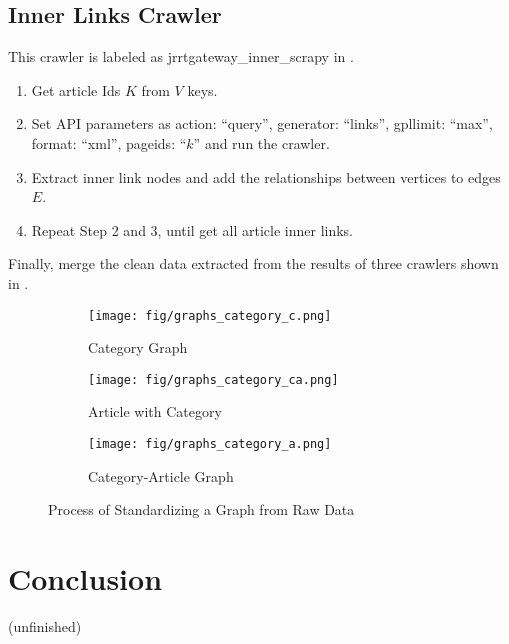 \subsection{Inner Links Crawler}

This crawler is labeled as jrrtgateway\_inner\_scrapy in .

\begin{enumerate}
	\item Get article Ids $K$ from $V$ keys.
	\item Set API parameters as {action: ``query'', generator: ``links'', gpllimit: ``max'', format: ``xml'', pageids: ``$k$''} and run the crawler. 
	\item Extract inner link nodes and add the relationships between vertices to edges $E$.
	\item Repeat Step 2 and 3, until get all article inner links.
\end{enumerate}

Finally, merge the clean data extracted from the results of three crawlers shown in .

\begin{figure}
	\centering
	\begin{subfigure}{0.31\textwidth}
		\texttt{[image: fig/graphs\_category\_c.png]}
		\caption{Category Graph} 
		\label{fig:section2-pic2}
	\end{subfigure}
	\hspace*{\fill} %
	\begin{subfigure}{0.31\textwidth}
		\texttt{[image: fig/graphs\_category\_ca.png]}
		\caption{Article with Category} \label{fig:section2-pic3}
	\end{subfigure}
	\hspace*{\fill} %
	\begin{subfigure}{0.31\textwidth}
		\texttt{[image: fig/graphs\_category\_a.png]}
		\caption{Category-Article Graph} \label{fig:section2-pic4}
	\end{subfigure}
	\caption{Process of Standardizing a Graph from Raw Data} \label{fig:section2-pic234}
\end{figure}

\section{Conclusion}
(unfinished)



